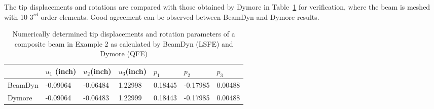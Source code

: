 The tip displacements and rotations are compared with those obtained by Dymore in Table~\ref{E2Tip} for verification, where the beam is meshed with 10 $3^{rd}$-order elements. Good agreement can be observed between BeamDyn and Dymore results.
\begin{table}[tbp]
\centering 
\caption{Numerically determined tip displacements and rotation parameters of
a composite beam in Example 2 as calculated by BeamDyn (LSFE) and Dymore
(QFE) }
\label{E2Tip} 
	\begin{tabular}{| l | l | l | l | l | l | l |}
    	\hline
    	 & $u_1$ (inch)& $u_2$(inch) & $u_3$(inch)  & $p_1$ & $p_2$ & $p_3$  \\ 
	 \hline
	 BeamDyn & -0.09064 & -0.06484 & 1.22998 & 0.18445 & -0.17985 & 0.00488 \\
	 \hline
	 Dymore & -0.09064 & -0.06483 & 1.22999 & 0.18443 & -0.17985 & 0.00488 \\
    	\hline
    \end{tabular}
\end{table}

